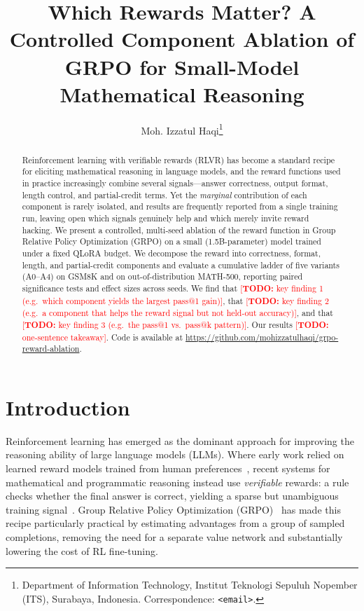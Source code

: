 \documentclass[11pt]{article}
\title{\textbf{Which Rewards Matter? A Controlled Component Ablation of\\
GRPO for Small-Model Mathematical Reasoning}}
\author{
  Moh. Izzatul Haqi\thanks{Department of Information Technology,
  Institut Teknologi Sepuluh Nopember (ITS), Surabaya, Indonesia.
  Correspondence: \texttt{<email>}.} \quad
  \todo{Advisor name (co-author)} \\
  \todo{affiliation / lab}
}
\date{}
\newcommand{\todo}[1]{\textcolor{red}{[\textbf{TODO:} #1]}}
\begin{document}
\maketitle

\begin{abstract}
Reinforcement learning with verifiable rewards (RLVR) has become a standard
recipe for eliciting mathematical reasoning in language models, and the reward
functions used in practice increasingly combine several signals---answer
correctness, output format, length control, and partial-credit terms. Yet the
\emph{marginal} contribution of each component is rarely isolated, and results
are frequently reported from a single training run, leaving open which signals
genuinely help and which merely invite reward hacking. We present a controlled,
multi-seed ablation of the reward function in Group Relative Policy Optimization
(GRPO) on a small (1.5B-parameter) model trained under a fixed QLoRA budget. We
decompose the reward into correctness, format, length, and partial-credit
components and evaluate a cumulative ladder of five variants (A0--A4) on GSM8K
and on out-of-distribution MATH-500, reporting paired significance tests and
effect sizes across seeds. We find that \todo{key finding 1 (e.g.\ which
component yields the largest pass@1 gain)}, that \todo{key finding 2 (e.g.\ a
component that helps the reward signal but not held-out accuracy)}, and that
\todo{key finding 3 (e.g.\ the pass@1 vs.\ pass@k pattern)}. Our results
\todo{one-sentence takeaway}. Code is available at
\url{https://github.com/mohizzatulhaqi/grpo-reward-ablation}.
\end{abstract}

\section{Introduction}
Reinforcement learning has emerged as the dominant approach for improving the
reasoning ability of large language models (LLMs). Where early work relied on
learned reward models trained from human preferences~\citep{instructgpt}, recent
systems for mathematical and programmatic reasoning instead use
\emph{verifiable} rewards: a rule checks whether the final answer is correct,
yielding a sparse but unambiguous training signal~\citep{deepseekr1}. Group
Relative Policy Optimization (GRPO)~\citep{deepseekmath} has made this recipe
particularly practical by estimating advantages from a group of sampled
completions, removing the need for a separate value network and substantially
lowering the cost of RL fine-tuning.
\end{document}
